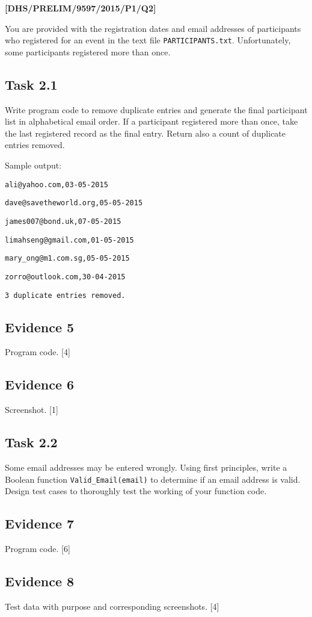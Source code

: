 \item \textbf{{[}DHS/PRELIM/9597/2015/P1/Q2{]} }

You are provided with the registration dates and email addresses of
participants who registered for an event in the text file \texttt{PARTICIPANTS.txt}.
Unfortunately, some participants registered more than once. 

\subsection*{Task 2.1 }

Write program code to remove duplicate entries and generate the final
participant list in alphabetical email order. If a participant registered
more than once, take the last registered record as the final entry.
Return also a count of duplicate entries removed. 

Sample output:

\noindent %
\noindent\begin{minipage}[t]{1\columnwidth}%
\texttt{ali@yahoo.com,03-05-2015}

\texttt{dave@savetheworld.org,05-05-2015 }

\texttt{james007@bond.uk,07-05-2015}

\texttt{limahseng@gmail.com,01-05-2015 }

\texttt{mary\_ong@m1.com.sg,05-05-2015 }

\texttt{zorro@outlook.com,30-04-2015 }

\texttt{3 duplicate entries removed.}%
\end{minipage}

\subsection*{Evidence 5 }

Program code. \hfill{}{[}4{]}

\subsection*{Evidence 6 }

Screenshot.\hfill{} {[}1{]}

\subsection*{Task 2.2 }

Some email addresses may be entered wrongly. Using first principles,
write a Boolean function \texttt{Valid\_Email(email)} to determine
if an email address is valid. Design test cases to thoroughly test
the working of your function code. 

\subsection*{Evidence 7 }

Program code.\hfill{} {[}6{]}

\subsection*{Evidence 8}

Test data with purpose and corresponding screenshots. \hfill{}{[}4{]}